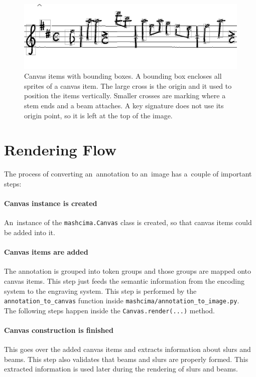 \begin{figure}[h]
    \centering
    \includegraphics[width=140mm]{../img/canvas-items}
    \caption{Canvas items with bounding boxes. A bounding box encloses all sprites of a canvas item. The large cross is the origin and it used to position the items vertically. Smaller crosses are marking where a stem ends and a beam attaches. A key signature does not use its origin point, so it is left at the top of the image.}
    \label{fig5:CanvasItems}
\end{figure}


\section{Rendering Flow}

The process of converting an~annotation to an~image has a~couple of important steps:

\paragraph{Canvas instance is created} An~instance of the \verb`mashcima.`\allowbreak\verb`Canvas` class is created, so that canvas items could be added into it.

\paragraph{Canvas items are added} The annotation is grouped into token groups and those groups are mapped onto canvas items. This step just feeds the semantic information from the encoding system to the engraving system. This step is performed by the \verb`annotation_`\allowbreak\verb`to_canvas` function inside \verb`mashcima/`\allowbreak\verb`annotation_`\allowbreak\verb`to_image.py`.
\\

The following steps happen inside the \verb`Canvas`\allowbreak\verb`.render(...)` method.

\paragraph{Canvas construction is finished} This goes over the added canvas items and extracts information about slurs and beams. This step also validates that beams and slurs are properly formed. This extracted information is used later during the rendering of slurs and beams.

